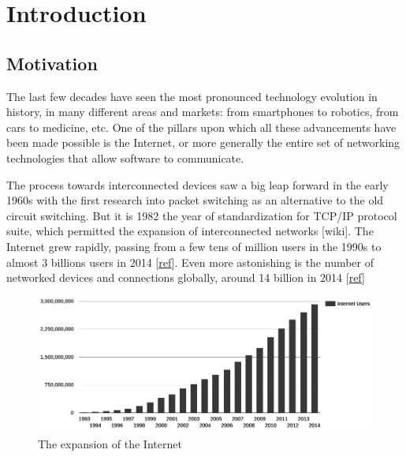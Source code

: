 \chapter{Introduction}
\label{chap:introduction}

\section{Motivation}
The last few decades have seen the most pronounced technology evolution in history, in many different areas and markets: from smartphones to robotics, from cars to medicine, etc. One of the pillars upon which all these advancements have been made possible is the Internet, or more generally the entire set of networking technologies that allow software to communicate. 


The process towards interconnected devices saw a big leap forward in the early 1960s with the first research into packet switching as an alternative to the old circuit switching. But it is 1982 the year of standardization for TCP/IP protocol suite, which permitted the expansion of interconnected networks  [wiki]. The Internet grew rapidly, passing from a few tens of million users in the 1990s to almost 3 billions users in 2014 [\href{http://www.internetlivestats.com/internet-users}{ref}]. Even more astonishing is the number of networked devices and connections globally, around 14 billion in 2014 [\href{http://www.cisco.com/c/en/us/solutions/service-provider/visual-networking-index-vni/index.html#~complete-forecast}{ref}]

\begin{figure}[!htb]
\centering
\includegraphics[width=\textwidth]{images/internet_growth}
\caption{The expansion of the Internet}
\label{fig:internet_growth}
\end{figure}

